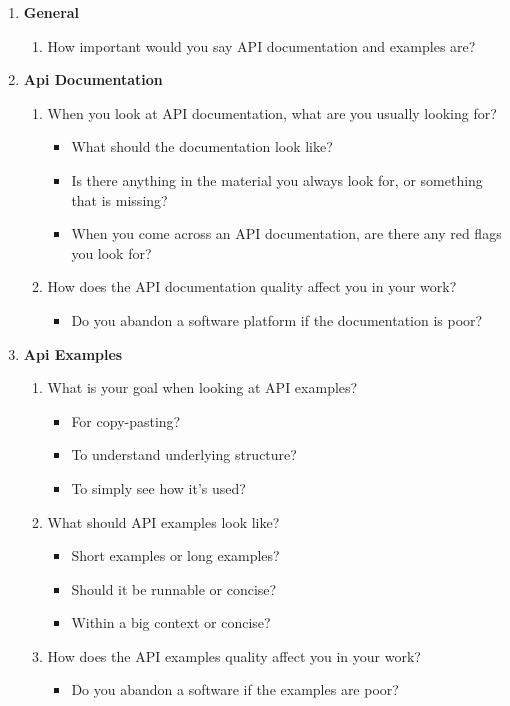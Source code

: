 \documentclass{article}
\begin{document}
\begin{enumerate}[label={A\Alph*}]
\item \textbf{General}
\begin{enumerate}[label={AA\arabic*}]
\item How important would you say API documentation and examples are?
\end{enumerate}
\item \textbf{Api Documentation}
\begin{enumerate}[label=AB\arabic*]
\item When you look at API documentation, what are you usually looking for?
\begin{itemize}[label={-}]
\item What should the documentation look like?
\item Is there anything in the material you always look for, or something that is missing?
\item When you come across an API documentation, are there any red flags you look for?
\end{itemize}
\item    How does the API documentation quality affect you in your work?
\begin{itemize}[label={-}]
\item Do you abandon a software platform if the documentation is poor?
\end{itemize}
\end{enumerate}
\item \textbf{Api Examples}
\begin{enumerate}[label={AC\arabic*}]
\item    What is your goal when looking at API examples?
\begin{itemize}[label={-}]
\item For copy-pasting?
\item To understand underlying structure?
\item To simply see how it's used?
\end{itemize}
\item   What should API examples look like?
\begin{itemize}[label={-}]
\item Short examples or long examples?
\item Should it be runnable or concise?
\item Within a big context or concise?
\end{itemize}
\item    How does the API examples quality affect you in your work?
\begin{itemize}[label={-}]
\item Do you abandon a software if the examples are poor?
\end{itemize}
\end{enumerate}


\end{enumerate}
\end{document}
